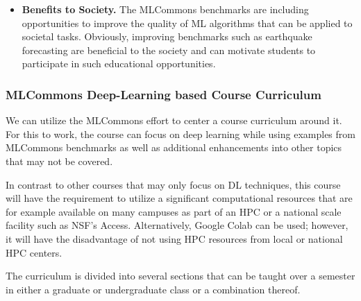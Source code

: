 \documentclass[utf8]{FrontiersinVancouver} %
\begin{document}
\begin{itemize}
  \item {\bf Benefits to Society.} The MLCommons benchmarks are
    including opportunities to improve the quality of ML algorithms
    that can be applied to societal tasks. Obviously, improving
    benchmarks such as earthquake forecasting are beneficial to the
    society and can motivate students to participate in such
    educational opportunities.

\end{itemize}


\subsubsection{MLCommons Deep-Learning based Course Curriculum}

We can utilize the MLCommons effort to center a course curriculum
around it. For this to work, the course can focus on deep
learning while using examples from MLCommons benchmarks as well as
additional enhancements into other topics that may not be covered.

In contrast to other courses that may only focus on DL techniques,
this course will have the requirement to utilize a significant
computational resources that are for example available on many
campuses as part of an HPC or a national scale facility such as
NSF's Access. Alternatively, Google Colab can be used; however, it will have
the disadvantage of not using HPC resources from local or national HPC
centers.

The curriculum is divided into several sections that can be taught
over a semester in either a graduate or undergraduate class or a
combination thereof.
\end{document}
